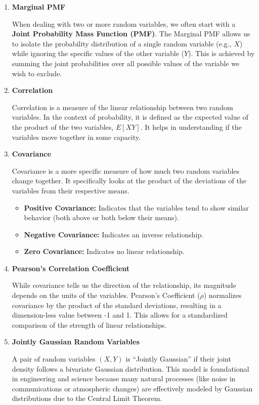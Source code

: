\documentclass[11pt]{article}
\begin{document}
\begin{enumerate}
    \item \textbf{Marginal PMF}
    
    When dealing with two or more random variables, we often start with a \textbf{Joint Probability Mass Function (PMF)}. The Marginal PMF allows us to isolate the probability distribution of a single random variable (e.g., $X$) while ignoring the specific values of the other variable ($Y$). This is achieved by summing the joint probabilities over all possible values of the variable we wish to exclude.

    

    \item \textbf{Correlation} 
    
    Correlation is a measure of the linear relationship between two random variables. In the context of probability, it is defined as the expected value of the product of the two variables, $E[XY]$. It helps in understanding if the variables move together in some capacity.

    \item \textbf{Covariance} 
    
    Covariance is a more specific measure of how much two random variables change together. It specifically looks at the product of the deviations of the variables from their respective means. 
    \begin{itemize}
        \item \textbf{Positive Covariance:} Indicates that the variables tend to show similar behavior (both above or both below their means).
        \item \textbf{Negative Covariance:} Indicates an inverse relationship.
        \item \textbf{Zero Covariance:} Indicates no linear relationship.
    \end{itemize}

    \item \textbf{Pearson’s Correlation Coefficient} 
    
    While covariance tells us the direction of the relationship, its magnitude depends on the units of the variables. Pearson’s Coefficient ($\rho$) normalizes covariance by the product of the standard deviations, resulting in a dimension-less value between -1 and 1. This allows for a standardized comparison of the strength of linear relationships.

    

    \item \textbf{Jointly Gaussian Random Variables} 
    
    A pair of random variables $(X, Y)$ is ``Jointly Gaussian'' if their joint density follows a bivariate Gaussian distribution. This model is foundational in engineering and science because many natural processes (like noise in communications or atmospheric changes) are effectively modeled by Gaussian distributions due to the Central Limit Theorem.
\end{enumerate}
\end{document}
